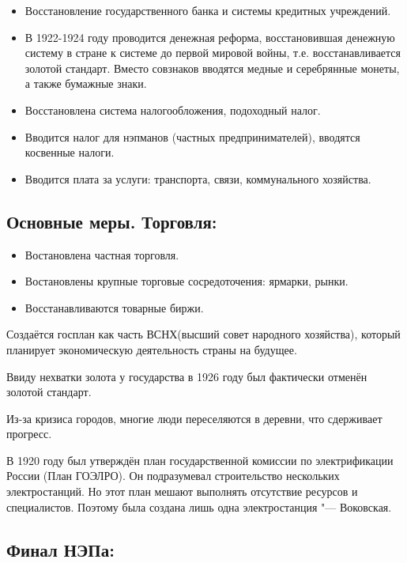 \begin{itemize}
    \item Восстановление государственного банка и системы кредитных учреждений.
    \item В 1922-1924 году проводится денежная реформа, восстановившая денежную систему в стране к системе до первой мировой войны, т.е. восстанавливается золотой стандарт. Вместо совзнаков вводятся медные и серебрянные монеты, а также бумажные знаки.
    \item Восстановлена система налогообложения, подоходный налог.
    \item Вводится налог для нэпманов (частных предпринимателей), вводятся косвенные налоги.
    \item Вводится плата за услуги: транспорта, связи, коммунального хозяйства.
\end{itemize}

\subsection{Основные меры. Торговля:}

\begin{itemize}
    \item Востановлена частная торговля.
    \item Востановлены крупные торговые сосредоточения: ярмарки, рынки. 
    \item Восстанавливаются товарные биржи.
\end{itemize}

\vspace{0.5cm}

Создаётся госплан как часть ВСНХ(высший совет народного хозяйства), который планирует экономическую деятельность страны на будущее. 

Ввиду нехватки золота у государства в 1926 году был фактически отменён золотой стандарт.

Из-за кризиса городов, многие люди переселяются в деревни, что сдерживает прогресс.

В 1920 году был утверждён план государственной комиссии по электрификации России (План ГОЭЛРО). Он подразумевал строительство нескольких электростанций. Но этот план мешают выполнять отсутствие ресурсов и специалистов. Поэтому была создана лишь одна электростанция "--- Воковская.

\subsection{Финал НЭПа:}

